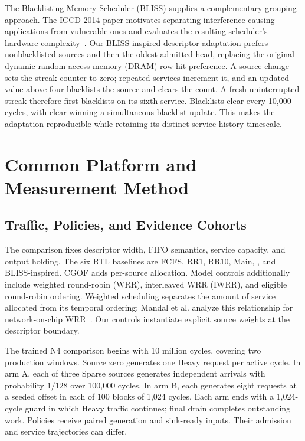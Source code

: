 The Blacklisting Memory Scheduler (BLISS) supplies a complementary grouping approach. The ICCD 2014 paper motivates separating interference-causing applications from vulnerable ones and evaluates the resulting scheduler's hardware complexity~\cite{bliss}. Our BLISS-inspired descriptor adaptation prefers nonblacklisted sources and then the oldest admitted head, replacing the original dynamic random-access memory (DRAM) row-hit preference. A source change sets the streak counter to zero; repeated services increment it, and an updated value above four blacklists the source and clears the count. A fresh uninterrupted streak therefore first blacklists on its sixth service. Blacklists clear every 10,000 cycles, with clear winning a simultaneous blacklist update. This makes the adaptation reproducible while retaining its distinct service-history timescale.

\section{Common Platform and Measurement Method}
\label{sec:method}
\subsection{Traffic, Policies, and Evidence Cohorts}
The comparison fixes descriptor width, FIFO semantics, service capacity, and output holding. The six RTL baselines are FCFS, RR1, RR10, Main, \Alg, and BLISS-inspired. CGOF adds per-source allocation. Model controls additionally include weighted round-robin (WRR), interleaved WRR (IWRR), and eligible round-robin ordering. Weighted scheduling separates the amount of service allocated from its temporal ordering; Mandal et al. analyze this relationship for network-on-chip WRR~\cite{wrr_mandal}. Our controls instantiate explicit source weights at the descriptor boundary.

The trained N4 comparison begins with 10 million cycles, covering two production windows. Source zero generates one Heavy request per active cycle. In arm A, each of three Sparse sources generates independent arrivals with probability $1/128$ over 100,000 cycles. In arm B, each generates eight requests at a seeded offset in each of 100 blocks of 1,024 cycles. Each arm ends with a 1,024-cycle guard in which Heavy traffic continues; final drain completes outstanding work. Policies receive paired generation and sink-ready inputs. Their admission and service trajectories can differ.


